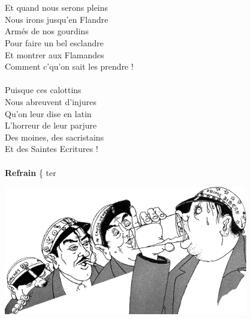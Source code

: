 \\\\Et quand nous serons pleins
\\Nous irons jusqu'en Flandre
\\Armés de nos gourdins
\\Pour faire un bel esclandre
\\Et montrer aux Flamandes
\\Comment c'qu'on sait les prendre !
\\\\Puisque ces calottins 
\\Nous abreuvent d'injures
\\Qu'on leur dise en latin
\\L'horreur de leur parjure
\\Des moines, des sacristains
\\Et des Saintes Ecritures ! 
\\\\\textbf{Refrain} \{ ter
\begin{center}
   \includegraphics[width=0.8\textwidth]{images/Wallon.jpg}
 \end{center}
\breakpage